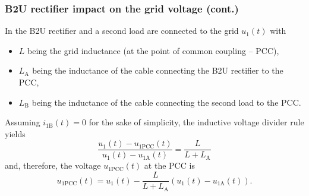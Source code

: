 \begin{frame}
	\frametitle{B2U rectifier impact on the grid voltage (cont.)}
	In  the B2U rectifier and a second load are connected to the grid $u_1(t)$ with
	\begin{itemize}
		\item $L$ being the grid inductance (at the point of common coupling -- PCC),\pause
		\item $L_\mathrm{A}$ being the inductance of the cable connecting the B2U rectifier to the PCC,\pause
		\item $L_\mathrm{B}$ being the inductance of the cable connecting the second load to the PCC.\pause
	\end{itemize}
	Assuming $i_{1\mathrm{B}}(t)=0$ for the sake of simplicity, the inductive voltage divider rule yields
	\begin{equation}
		\frac{u_1(t)-u_{1\mathrm{PCC}}(t)}{u_1(t)-u_{1\mathrm{A}}(t)} = \frac{L}{L+L_\mathrm{A}}
	\end{equation}\pause
	and, therefore, the voltage $u_{1\mathrm{PCC}}(t)$ at the PCC is
	\begin{equation}
		u_{1\mathrm{PCC}}(t) = u_1(t) - \frac{L}{L+L_\mathrm{A}}(u_1(t)-u_{1\mathrm{A}}(t)).
	\end{equation}
\end{frame}

